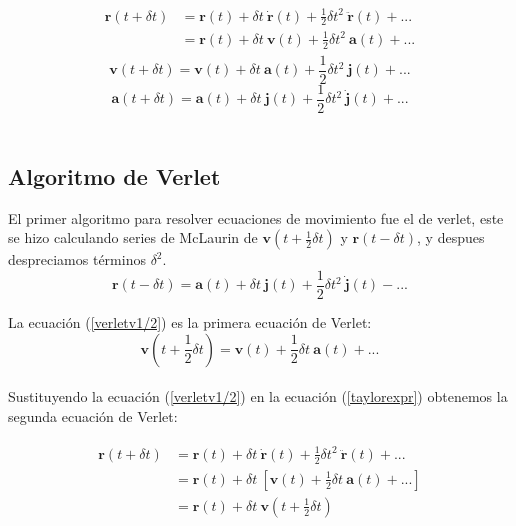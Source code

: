 \begin{align} \label{taylorexpr}
\begin{split}
    \mathbf{r}(t + \delta t) &= \mathbf{r}(t)+\delta t\ \dot{\mathbf{r}}(t) + \frac{1}{2}\delta t^2\  \ddot{\mathbf{r}}(t)+...\\
                             &= \mathbf{r}(t)+\delta t\ \mathbf{v}(t) + \frac{1}{2}\delta t^2\ \mathbf{a}(t)+...
\end{split}
\end{align}
\begin{equation}\label{taylorexpv}
    \mathbf{v}(t + \delta t) = \mathbf{v}(t)+\delta t\ \mathbf{a}(t) + \frac{1}{2}\delta t^2\ \mathbf{j}(t)+...
\end{equation}
\begin{equation}\label{taylorexpa}
    \mathbf{a}(t + \delta t) = \mathbf{a}(t)+\delta t\ \mathbf{j}(t) + \frac{1}{2}\delta t^2\ \dot{\mathbf{j}}(t)+...
\end{equation}\\

\subsection{Algoritmo de Verlet}

El primer algoritmo para resolver ecuaciones de movimiento fue el de verlet, este se hizo calculando series de McLaurin de $\mathbf{v}(t+\frac{1}{2}\delta t)$ y $\mathbf{r}(t-\delta t)$, y despues despreciamos términos $\delta^2$.\\

\begin{equation}\label{taylorexpr-}
    \mathbf{r}(t - \delta t) = \mathbf{a}(t)+\delta t\ \mathbf{j}(t) + \frac{1}{2}\delta t^2\ \mathbf{\dot{j}}(t)-...
\end{equation}

La ecuación (\ref{verletv1/2}) es la primera ecuación de Verlet:\\
\begin{equation}\label{verletv1/2}
    \mathbf{v}(t + \frac{1}{2}\delta t) = \mathbf{v}(t)+\frac{1}{2}\delta t\ \mathbf{a}(t) +...
\end{equation}\\

Sustituyendo la ecuación (\ref{verletv1/2}) en la ecuación (\ref{taylorexpr}) obtenemos la segunda ecuación de Verlet:

\begin{align} \label{verletr}
\begin{split}
    \mathbf{r}(t + \delta t) &= \mathbf{r}(t)+\delta t\ \dot{\mathbf{r}}(t) + \frac{1}{2}\delta t^2\ \ddot{\mathbf{r}}(t)+...\\
                             &= \mathbf{r}(t)+\delta t\ \left[\mathbf{v}(t) + \frac{1}{2}\delta t\ \mathbf{a}(t)+...\right]\\
                             &= \mathbf{r}(t)+\delta t\ \mathbf{v}(t+\frac{1}{2}\delta t)
\end{split}
\end{align}

